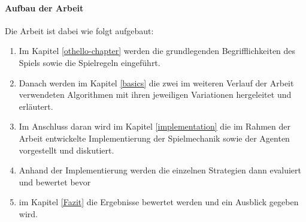 \paragraph{Aufbau der Arbeit}
Die Arbeit ist dabei wie folgt aufgebaut:
\begin{enumerate}
\item Im Kapitel \ref{othello-chapter} werden die grundlegenden Begrifflichkeiten des Spiels sowie die Spielregeln eingeführt.
\item Danach werden im Kapitel \ref{basics} die zwei im weiteren Verlauf der Arbeit verwendeten Algorithmen mit ihren jeweiligen Variationen hergeleitet und erläutert.
\item Im Anschluss daran wird im Kapitel \ref{implementation} die im Rahmen der Arbeit entwickelte Implementierung der Spielmechanik sowie der Agenten vorgestellt und diskutiert.
\item Anhand der Implementierung werden die einzelnen Strategien dann evaluiert und bewertet bevor
\item im Kapitel \ref{Fazit} die Ergebnisse bewertet werden und ein Ausblick gegeben wird.
\end{enumerate}
